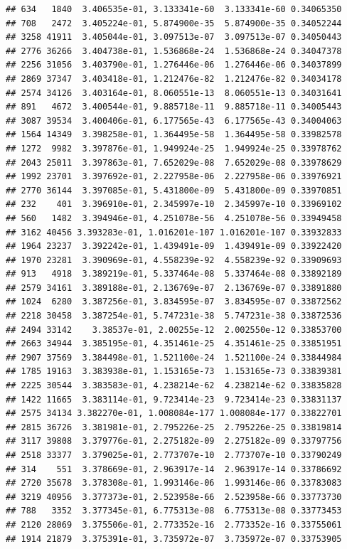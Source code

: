 \documentclass[
]{article}
\begin{document}
\begin{verbatim}
## 634   1840  3.406535e-01, 3.133341e-60  3.133341e-60 0.34065350
## 708   2472  3.405224e-01, 5.874900e-35  5.874900e-35 0.34052244
## 3258 41911  3.405044e-01, 3.097513e-07  3.097513e-07 0.34050443
## 2776 36266  3.404738e-01, 1.536868e-24  1.536868e-24 0.34047378
## 2256 31056  3.403790e-01, 1.276446e-06  1.276446e-06 0.34037899
## 2869 37347  3.403418e-01, 1.212476e-82  1.212476e-82 0.34034178
## 2574 34126  3.403164e-01, 8.060551e-13  8.060551e-13 0.34031641
## 891   4672  3.400544e-01, 9.885718e-11  9.885718e-11 0.34005443
## 3087 39534  3.400406e-01, 6.177565e-43  6.177565e-43 0.34004063
## 1564 14349  3.398258e-01, 1.364495e-58  1.364495e-58 0.33982578
## 1272  9982  3.397876e-01, 1.949924e-25  1.949924e-25 0.33978762
## 2043 25011  3.397863e-01, 7.652029e-08  7.652029e-08 0.33978629
## 1992 23701  3.397692e-01, 2.227958e-06  2.227958e-06 0.33976921
## 2770 36144  3.397085e-01, 5.431800e-09  5.431800e-09 0.33970851
## 232    401  3.396910e-01, 2.345997e-10  2.345997e-10 0.33969102
## 560   1482  3.394946e-01, 4.251078e-56  4.251078e-56 0.33949458
## 3162 40456 3.393283e-01, 1.016201e-107 1.016201e-107 0.33932833
## 1964 23237  3.392242e-01, 1.439491e-09  1.439491e-09 0.33922420
## 1970 23281  3.390969e-01, 4.558239e-92  4.558239e-92 0.33909693
## 913   4918  3.389219e-01, 5.337464e-08  5.337464e-08 0.33892189
## 2579 34161  3.389188e-01, 2.136769e-07  2.136769e-07 0.33891880
## 1024  6280  3.387256e-01, 3.834595e-07  3.834595e-07 0.33872562
## 2218 30458  3.387254e-01, 5.747231e-38  5.747231e-38 0.33872536
## 2494 33142    3.38537e-01, 2.00255e-12  2.002550e-12 0.33853700
## 2663 34944  3.385195e-01, 4.351461e-25  4.351461e-25 0.33851951
## 2907 37569  3.384498e-01, 1.521100e-24  1.521100e-24 0.33844984
## 1785 19163  3.383938e-01, 1.153165e-73  1.153165e-73 0.33839381
## 2225 30544  3.383583e-01, 4.238214e-62  4.238214e-62 0.33835828
## 1422 11665  3.383114e-01, 9.723414e-23  9.723414e-23 0.33831137
## 2575 34134 3.382270e-01, 1.008084e-177 1.008084e-177 0.33822701
## 2815 36726  3.381981e-01, 2.795226e-25  2.795226e-25 0.33819814
## 3117 39808  3.379776e-01, 2.275182e-09  2.275182e-09 0.33797756
## 2518 33377  3.379025e-01, 2.773707e-10  2.773707e-10 0.33790249
## 314    551  3.378669e-01, 2.963917e-14  2.963917e-14 0.33786692
## 2720 35678  3.378308e-01, 1.993146e-06  1.993146e-06 0.33783083
## 3219 40956  3.377373e-01, 2.523958e-66  2.523958e-66 0.33773730
## 788   3352  3.377345e-01, 6.775313e-08  6.775313e-08 0.33773453
## 2120 28069  3.375506e-01, 2.773352e-16  2.773352e-16 0.33755061
## 1914 21879  3.375391e-01, 3.735972e-07  3.735972e-07 0.33753905

\end{verbatim}
\end{document}
